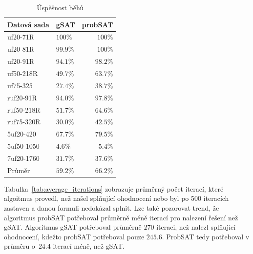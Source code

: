 \documentclass[twoside,twocolumn]{article}
\begin{document}
    \begin{table}
        \caption{Úspěšnost běhů}
        \centering
        \begin{tabular}{llr}
            \toprule
            Datová sada & gSAT     & probSAT  \\
            \midrule
            uf20-71R    & $100\%$  & $100\%$  \\
            uf20-81R    & $99.9\%$ & $100\%$  \\
            uf20-91R    & $94.1\%$ & $98.2\%$ \\
            uf50-218R   & $49.7\%$ & $63.7\%$ \\
            uf75-325    & $27.4\%$ & $38.7\%$ \\
            ruf20-91R   & $94.0\%$ & $97.8\%$ \\
            ruf50-218R  & $51.7\%$ & $64.6\%$ \\
            ruf75-320R  & $30.0\%$ & $42.5\%$ \\
            5uf20-420   & $67.7\%$ & $79.5\%$ \\
            5uf50-1050  & $4.6\%$  & $5.4\%$  \\
            7uf20-1760  & $31.7\%$ & $37.6\%$ \\
            \midrule
            Průměr      & $59.2\%$ & $66.2\%$ \\
            \bottomrule
        \end{tabular}
        \label{tab:success_ratio}
    \end{table}

    Tabulka~\ref{tab:average_iterations} zobrazuje průměrný počet iterací, které algoitmus provedl, než našel splňující
    ohodnocení nebo byl po 500 iteracích zastaven a danou formuli nedokázal splnit.
    Lze také pozorovat trend, že algoritmus probSAT potřeboval průměrně méně iterací pro nalezení řešení než gSAT\@.
    Algoritmus gSAT potřeboval průměrně $270$ iteraci, než nalezl splňující ohodnocení, kdežto probSAT potřeboval pouze $245.6$.
    ProbSAT tedy potřeboval v průměru o~$24.4$ iterací méně, než gSAT\@.
\end{document}
